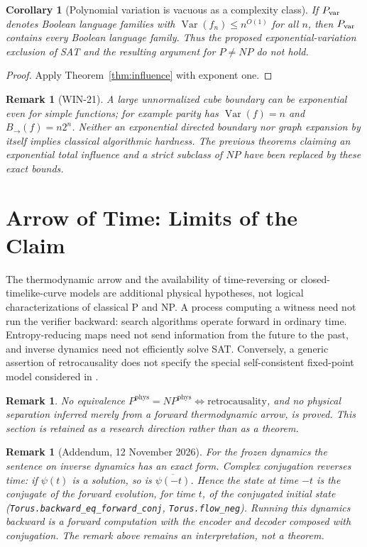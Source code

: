 \documentclass[11pt,a4paper]{article}
\newtheorem{corollary}[theorem]{Corollary}
\newtheorem{remark}[theorem]{Remark}
\begin{document}
\begin{corollary}[Polynomial variation is vacuous as a complexity class]
\label{cor:var}
If $P_{\rm var}$ denotes Boolean language families with
$\operatorname{Var}(f_n)\le n^{O(1)}$ for all $n$, then
$P_{\rm var}$ contains every Boolean language family. Thus the proposed
exponential-variation exclusion of SAT and the resulting argument for
$P\ne NP$ do not hold.
\end{corollary}
\begin{proof}
Apply Theorem~\ref{thm:influence} with exponent one.
\end{proof}
\begin{remark}[WIN-21]
A large \emph{unnormalized} cube boundary can be exponential even for
simple functions; for example parity has
$\operatorname{Var}(f)=n$ and $B_{\to}(f)=n2^n$.
Neither an exponential directed boundary nor graph expansion by itself
implies classical algorithmic hardness. The previous theorems claiming an
exponential total influence and a strict subclass of $NP$ have been
replaced by these exact bounds.
\end{remark}

\section{Arrow of Time: Limits of the Claim}
The thermodynamic arrow and the availability of time-reversing or
closed-timelike-curve models are additional physical hypotheses, not
logical characterizations of classical P and NP. A process computing a
witness need not run the verifier backward: search algorithms operate
forward in ordinary time. Entropy-reducing maps need not send information
from the future to the past, and inverse dynamics need not efficiently
solve SAT. Conversely, a generic assertion of retrocausality does not
specify the special self-consistent fixed-point model considered in
\cite{AaronsonWatrous2009,Deutsch1991}.

\begin{remark}
No equivalence
$P^{\mathrm{phys}}=NP^{\mathrm{phys}}\iff\text{retrocausality}$,
and no physical separation inferred merely from a forward thermodynamic
arrow, is proved. This section is retained as a research direction rather
than as a theorem.
\end{remark}
\begin{remark}[Addendum, 12 November 2026]
For the frozen dynamics the sentence on inverse dynamics has an exact
form.  Complex conjugation reverses time: if $\psi(t)$ is a solution,
so is $\overline{\psi(-t)}$.  Hence the state at time $-t$ is the
conjugate of the forward evolution, for time $t$, of the conjugated
initial state
(\nolinkurl{Torus.backward_eq_forward_conj}, \nolinkurl{Torus.flow_neg}).
Running this dynamics backward is a forward computation with the
encoder and decoder composed with conjugation.  The remark above remains
an interpretation, not a theorem.
\end{remark}
\end{document}
